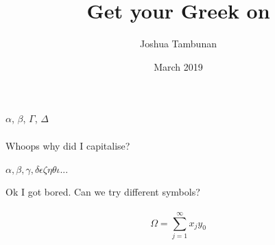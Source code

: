\documentclass{article}
\title{Get your Greek on}
\author{Joshua Tambunan}
\date{March 2019}
\begin{document}
 
\maketitle

$\alpha$, $\beta$, $\Gamma$, $\Delta$\\~\\
Whoops why did I capitalise? \\~\\
\begin{math}
\alpha, \beta, \gamma, \delta \epsilon \zeta \eta \theta \iota ...
\end{math}

Ok I got bored. Can we try different symbols?\\~\\

$$\Omega = \sum^\infty_{j=1} x_jy_0$$
\end{document}

